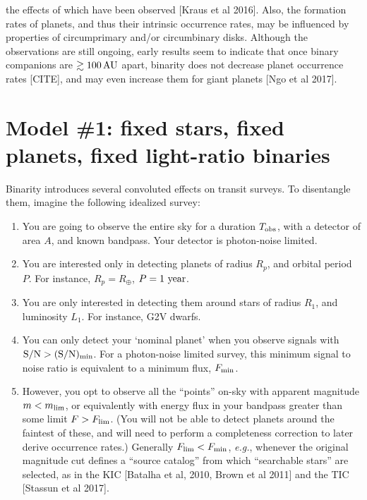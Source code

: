 \documentclass{emulateapj}
\begin{document}
 the effects of which have been observed [Kraus et al 
2016].
Also, the formation rates of planets, and thus their intrinsic occurrence 
rates, may be influenced by properties of circumprimary and/or circumbinary 
disks.
Although the observations are still ongoing, early results seem to indicate 
that once binary companions are $\gtrsim 100\,{\rm AU}$ apart, binarity does 
not decrease planet occurrence rates [CITE], and may even increase them for 
giant planets [Ngo et al 2017].

\section{Model \#1: fixed stars, fixed planets, fixed light-ratio binaries}
\label{sec:model_1}

Binarity introduces several convoluted effects on transit 
surveys. To disentangle them, imagine the following idealized survey:

\begin{enumerate}
\item You are going to observe the entire sky for a duration $T_{\rm obs}$, 
with a detector of area $A$, and known bandpass. Your detector is photon-noise 
limited.
%
\item You are interested only in detecting planets of radius $R_p$, and orbital 
period $P$. For instance, $R_p=R_\oplus$, $P={\rm 1\ year}$.
%
\item You are only interested in detecting them around stars of radius $R_1$, 
and luminosity $L_1$. For instance, G2V dwarfs.
%
\item You can only detect your `nominal planet' when you observe signals with
${\rm S/N} > {\rm (S/N)_{min}}$.
For a photon-noise limited survey, this minimum signal to noise ratio is 
equivalent to a minimum flux, $F_{\rm min}$.
%
\item However, you opt to observe all the ``points'' on-sky with apparent 
magnitude $m < m_{\rm lim}$, or equivalently with energy flux in your bandpass 
greater than some limit $F > F_{\rm lim}$.
(You will not be able to detect planets around the faintest of 
these, and will need to perform a completeness correction to later derive 
occurrence rates.)
Generally $F_{\rm lim} < F_{\rm min}$, \textit{e.g.}, whenever the original 
magnitude cut defines a ``source catalog'' from which ``searchable stars'' are 
selected, as in the KIC [Batalha et al, 2010, Brown et al 2011] and the TIC 
[Stassun et al 2017].
\end{enumerate}
\end{document}
